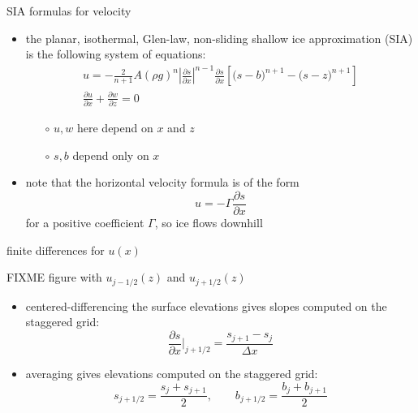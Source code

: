 \documentclass[10pt,dvipsnames]{beamer}
\begin{document}
\begin{frame}{SIA formulas for velocity}

\begin{itemize}
\item the planar, isothermal, Glen-law, non-sliding \alert{shallow ice approximation (SIA)} is the following system of equations:
\begin{gather*}
u = - \frac{2}{n+1} A (\rho g)^n \left|\frac{\partial s}{\partial x}\right|^{n-1} \frac{\partial s}{\partial x} \left[\big(s - b\big)^{n+1} - \big(s-z\big)^{n+1}\right] \\
\frac{\partial u}{\partial x} + \frac{\partial w}{\partial z} = 0
\end{gather*}

  \begin{itemize}
  \item[$\circ$] $u,w$ here depend on $x$ and $z$
  \item[$\circ$] $s,b$ depend only on $x$
  \end{itemize}

\item note that the horizontal velocity formula is of the form
	$$u = - \Gamma \frac{\partial s}{\partial x}$$
for a positive coefficient $\Gamma$, so \alert{ice flows downhill}
\end{itemize}
\end{frame}


\begin{frame}{finite differences for $u(x)$}

\begin{center}
FIXME figure with $u_{j-1/2}(z)$ and $u_{j+1/2}(z)$
\end{center}

\begin{itemize}
\item centered-differencing the surface elevations gives \alert{slopes computed on the staggered grid}:
    $$\frac{\partial s}{\partial x}\Big|_{j+1/2} = \frac{s_{j+1} - s_j}{\Delta x}$$
\item averaging gives \alert{elevations computed on the staggered grid}:
    $$s_{j+1/2} = \frac{s_j + s_{j+1}}{2}, \qquad b_{j+1/2} = \frac{b_j + b_{j+1}}{2}$$
\end{itemize}
\end{frame}
\end{document}
